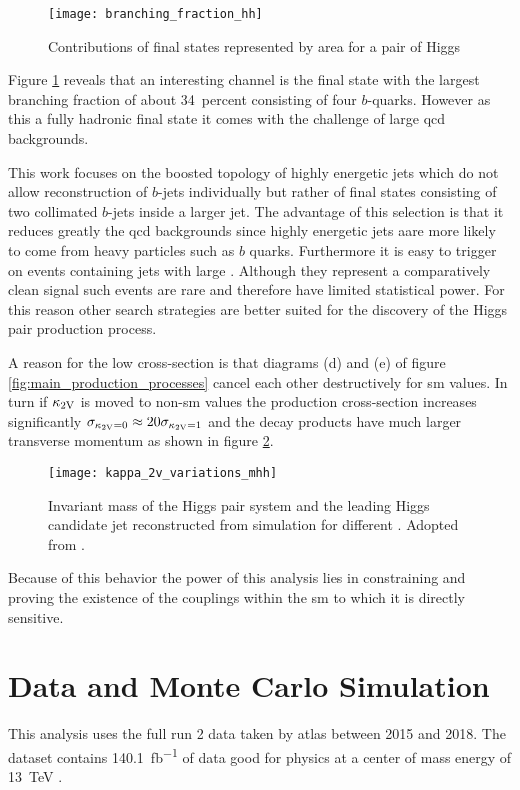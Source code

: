 \begin{figure}
    \centering
    \texttt{[image: branching\_fraction\_hh]}
    \caption[]{Contributions of final states represented by area for a pair of Higgs \citep{Abbott:2708599}}
    \label{fig:branching_fraction_hh}
\end{figure}
Figure \ref{fig:branching_fraction_hh} reveals that an interesting channel is the final state with the largest branching fraction of about \qty[]{34}{percent} consisting of four $b$-quarks. However as this a fully hadronic final state it comes with the challenge of large \ac{qcd} backgrounds.

This work focuses on the boosted topology of highly energetic jets which do not allow reconstruction of $b$-jets individually but rather of final states consisting of two collimated $b$-jets inside a larger jet. The advantage of this selection is that it reduces greatly the \ac{qcd} backgrounds since highly energetic jets aare more likely to come from heavy particles such as $b$ quarks. Furthermore it is easy to trigger on events containing jets with large \pt. Although they represent a comparatively clean signal such events are rare and therefore have limited statistical power. For this reason other search strategies are better suited for the discovery of the Higgs pair production process.

A reason for the low cross-section is that diagrams (d) and (e) of figure \ref{fig:main_production_processes} cancel each other destructively for \ac{sm} values. In turn if $\kappa_{\text{2V}}$ is moved to non-\ac{sm} values the production cross-section increases significantly $\sigma_{\kappa_{\text{2V}}=0}\approx 20\sigma_{\kappa_{\text{2V}}=1}$ \citep{bishara2017higgs} and the decay products have much larger transverse momentum as shown in figure \ref{fig:kappa_2v_variations_mhh}.
\begin{figure}
    \centering
    \texttt{[image: kappa\_2v\_variations\_mhh]}
    \caption[]{Invariant mass of the Higgs pair system and the leading Higgs candidate jet \pt  reconstructed from simulation for different \ktwov. Adopted from \citep{ATL-PHYS-PUB-2019-007}.}
    \label{fig:kappa_2v_variations_mhh}
\end{figure}
Because of this behavior the power of this analysis lies in constraining and proving the existence of the \ktwov couplings within the \ac{sm} to which it is directly sensitive.



\section{Data and Monte Carlo Simulation}
This analysis uses the full run 2 data taken by \ac{atlas} between 2015 and 2018. The dataset contains \qty[]{140.1}{fb^{-1}} of data good for physics at a center of mass energy of \qty[]{13}{TeV} \citep{DAPR-2021-01}.

